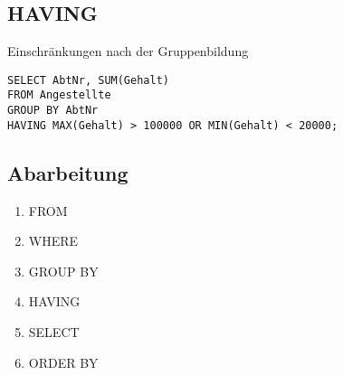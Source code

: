 \subsection{HAVING}
Einschränkungen nach der Gruppenbildung
\begin{verbatim}
SELECT AbtNr, SUM(Gehalt)
FROM Angestellte
GROUP BY AbtNr
HAVING MAX(Gehalt) > 100000 OR MIN(Gehalt) < 20000;
\end{verbatim}
\subsection{Abarbeitung}
\begin{enumerate}
	\item FROM
	\item WHERE
	\item GROUP BY
	\item HAVING
	\item SELECT
	\item ORDER BY
\end{enumerate}










